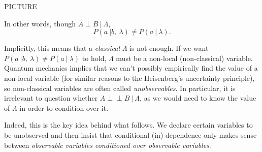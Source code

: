 \documentclass[11pt, oneside]{article}   	%
\def\ci{\perp\!\!\!\perp}
\begin{document}
PICTURE

In other words, though $A \perp B \ | \ \Lambda$, \[ P(a \ | b,\ \lambda) \neq P(a \ | \ \lambda).\]

Implicitly, this means that a \textit{classical} $\Lambda$ is not enough. If we want \(P(a \ | b,\ \lambda) \neq P(a \ | \ \lambda)\) to hold, \(\Lambda\) must be a non-local (non-classical) variable. Quantum mechanics implies that we can't possibly empirically find the value of a non-local variable (for similar reasons to the Heisenberg's uncertainty principle), so non-classical variables are often called \textit{unobservables}. In particular, it is irrelevant to question whether $A \ci B \ | \ \Lambda$, as we would need to know the value of \(\Lambda\) in order to condition over it.

Indeed, this is the key idea behind what follows. We declare certain variables to be unobserved and then insist that conditional (in)
dependence only makes sense between \emph{observable variables conditioned over observable variables}.


%
%
%
%
%
%
%
%
%
%
%
%
%
%
%
\end{document}
